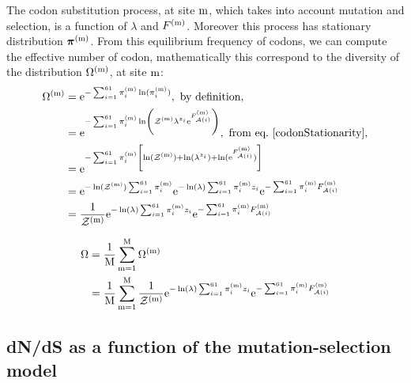 The \gls{codon} \gls{substitution} process, at site $\text{m}$, which takes into account mutation and selection, is a function of $\lambda$ and $F^{(\text{m})}$.
Moreover this process has stationary distribution $\bm{\pi}^{(\text{m})}$.
From this equilibrium frequency of \glspl{codon}, we can compute the effective number of \gls{codon}, mathematically this correspond to the diversity of the distribution ${\Omega}^{(\text{m})}$, at site $\text{m}$:
\begin{align}
    {\Omega}^{(\text{m})}
    & = \mathrm{e}^{ - \sum_{{i}=1}^{61}   \pi_{{i}}^{(\text{m})} \ln (  \pi_{{i}}^{(\text{m})} )}, \ \textrm{by definition},\\
    & = \mathrm{e}^{ - \sum_{{i}=1}^{61}   \pi_{{i}}^{(\text{m})} \ln \left( \mathcal{Z}^{(\text{m})} \lambda^{{z}_{{i}}} \mathrm{e}^{F_{\mathcal{A}({i})}^{(\text{m})}} \right)}, \ \textrm{from eq.} \ \ref{codonStationarity},\\
    & = \mathrm{e}^{ - \sum_{{i}=1}^{61}   \pi_{{i}}^{(\text{m})} \left[ \ln ( \mathcal{Z}^{(\text{m})} )+ \ln( \lambda^{{z}_{{i}}} ) + \ln (\mathrm{e}^{F_{\mathcal{A}({i})}^{(\text{m})}}) \right] }\\
    & = \mathrm{e}^{ - \ln ( \mathcal{Z}^{(\text{m})} ) \sum_{{i}=1}^{61}   \pi_{{i}}^{(\text{m})} } \mathrm{e}^{ -  \ln (\lambda) \sum_{{i}=1}^{61}   \pi_{{i}}^{(\text{m})} {z}_{{i}} }\mathrm{e}^{ - \sum_{{i}=1}^{61}   \pi_{{i}}^{(\text{m})} F_{\mathcal{A}({i})}^{(\text{m})}  } \\
    & = \frac{1}{\mathcal{Z}^{(\text{m})}} \mathrm{e}^{ -  \ln (\lambda) \sum_{{i}=1}^{61}   \pi_{{i}}^{(\text{m})} {z}_{{i}} }\mathrm{e}^{ - \sum_{{i}=1}^{61}   \pi_{{i}}^{(\text{m})} F_{\mathcal{A}({i})}^{(\text{m})}  }
    \label{eq:sit-entropy}
\end{align}

\begin{align}
  {\Omega} & = \dfrac{1}{\text{M}} \sum_{\text{m}=1}^{\text{M}} {\Omega}^{(\text{m})}\\
	& = \dfrac{1}{\text{M}} \sum_{\text{m}=1}^{\text{M}} \frac{1}{\mathcal{Z}^{(\text{m})}} \mathrm{e}^{ -  \ln (\lambda) \sum_{{i}=1}^{61}   \pi_{{i}}^{(\text{m})} {z}_{{i}} }\mathrm{e}^{ - \sum_{{i}=1}^{61}   \pi_{{i}}^{(\text{m})} F_{\mathcal{A}({i})}^{(\text{m})}  }
	\label{entropy}
\end{align}

\subsection{dN/dS as a function of the mutation-selection model}

